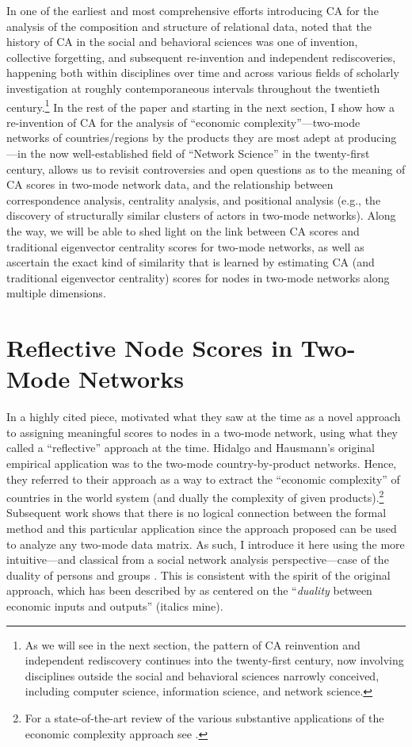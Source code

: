 \documentclass[a4paper,fleqn]{cas-sc}
\begin{document}
In one of the earliest and most comprehensive efforts introducing CA for the analysis of the composition and structure of relational data, \citet[19-21]{wasserman1990correspondence} noted that the history of CA in the social and behavioral sciences was one of invention, collective forgetting, and subsequent re-invention and independent rediscoveries, happening both within disciplines over time and across various fields of scholarly investigation at roughly contemporaneous intervals throughout the twentieth century.\footnote{As we will see in the next section, the pattern of CA reinvention and independent rediscovery continues into the twenty-first century, now involving disciplines outside the social and behavioral sciences narrowly conceived, including computer science, information science, and network science.} In the rest of the paper and starting in the next section, I show how a re-invention of CA for the analysis of ``economic complexity''---two-mode networks of countries/regions by the products they are most adept at producing---in the now well-established field of ``Network Science'' in the twenty-first century, allows us to revisit controversies and open questions as to the meaning of CA scores in two-mode network data, and the relationship between correspondence analysis, centrality analysis, and positional analysis (e.g., the discovery of structurally similar clusters of actors in two-mode networks). Along the way, we will be able to shed light on the link between CA scores and traditional eigenvector centrality scores for two-mode networks, as well as ascertain the exact kind of similarity that is learned by estimating CA (and traditional eigenvector centrality) scores for nodes in two-mode networks along multiple dimensions. 

\section{Reflective Node Scores in Two-Mode Networks} \label{sec:ref2mode}
In a highly cited piece, \citet{hidalgo2009building} motivated what they saw at the time as a novel approach to assigning meaningful scores to nodes in a two-mode network, using what they called a ``reflective'' approach at the time. Hidalgo and Hausmann's original empirical application was to the two-mode country-by-product networks. Hence, they referred to their approach as a way to extract the ``economic complexity'' of countries in the world system (and dually the complexity of given products).\footnote{For a state-of-the-art review of the various substantive applications of the economic complexity approach see \citet{hidalgo2021economic}.} Subsequent work shows that there is no logical connection between the formal method and this particular application since the approach proposed can be used to analyze any two-mode data matrix. As such, I introduce it here using the more intuitive---and classical from a social network analysis perspective---case of the duality of persons and groups \citep{breiger1974duality}. This is consistent with the spirit of the original approach, which has been described by \citet[92]{hidalgo2021economic} as centered on the ``\textit{duality} between economic inputs and outputs'' (italics mine).
\end{document}
